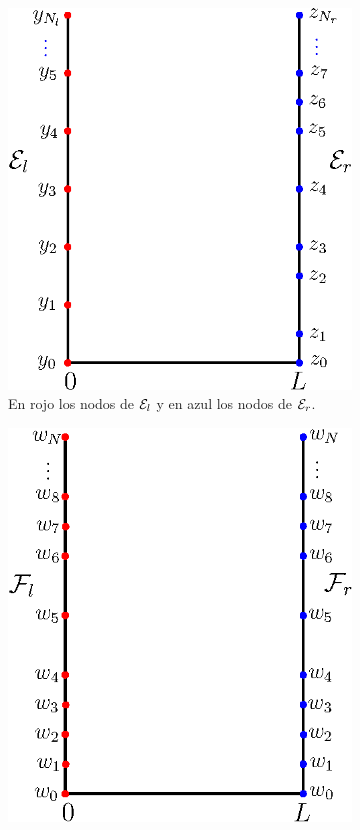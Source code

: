 \begin{figure}[H]
    \centering
    \begin{subfigure}[b]{0.45\textwidth}
        \centering
        \includegraphics[scale=0.8]{./img/dom_1.eps}
        \caption{En rojo los nodos de $\mathcal{E}_l$ y en azul los nodos de $\mathcal{E}_r$.}
        \label{fig:domain_1}
    \end{subfigure}
    \hfill
    \begin{subfigure}[b]{0.45\textwidth}
        \centering
        \includegraphics[scale=0.8]{./img/dom_2.eps}

\end{subfigure}
\end{figure}

